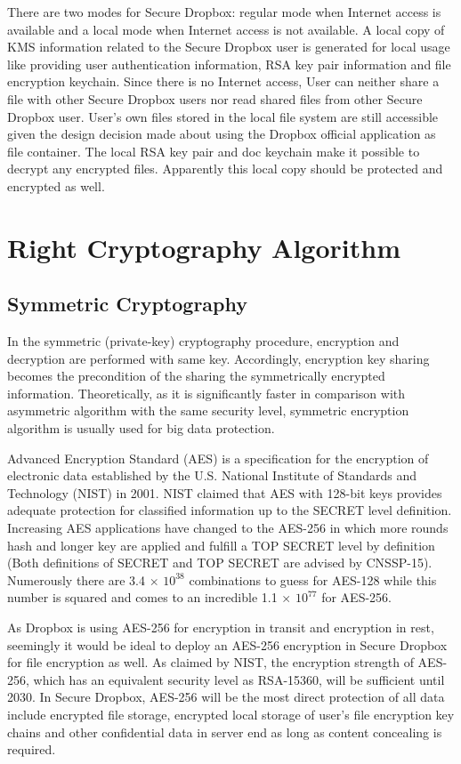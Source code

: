There are two modes for Secure Dropbox: regular mode when Internet access is available and a local mode when Internet access is not available. A local copy of KMS information related to the Secure Dropbox user is generated for local usage like providing user authentication information, RSA key pair information and file encryption keychain. Since there is no Internet access, User can neither share a file with other Secure Dropbox users nor read shared files from other Secure Dropbox user. User’s own files stored in the local file system are still accessible given the design decision made about using the Dropbox official application as file container. The local RSA key pair and doc keychain make it possible to decrypt any encrypted files. Apparently this local copy should be protected and encrypted as well.

\section{Right Cryptography Algorithm}

\subsection{Symmetric Cryptography}

In the symmetric (private-key) cryptography procedure, encryption and decryption are performed with same key\cite{Bellare1997}. Accordingly, encryption key sharing becomes the precondition of the sharing the symmetrically encrypted information. Theoretically, as it is significantly faster in comparison with asymmetric algorithm with the same security level, symmetric encryption algorithm is usually used for big data protection.

Advanced Encryption Standard (AES) is a specification for the encryption of electronic data established by the U.S. National Institute of Standards and Technology (NIST) in 2001\cite{Information2001}. NIST claimed that AES with 128-bit keys provides adequate protection for classified information up to the SECRET level definition. Increasing AES applications have changed to the AES-256 in which more rounds hash and longer key are applied and fulfill a TOP SECRET level by definition (Both definitions of SECRET and TOP SECRET are advised by CNSSP-15\cite{National2003}). Numerously there are 3.4 $\times$ $10^{38}$ combinations to guess for AES-128 while this number is squared and comes to an incredible 1.1 $\times$ $10^{77}$ for AES-256.

As Dropbox is using AES-256 for encryption in transit and encryption in rest, seemingly it would be ideal to deploy an AES-256 encryption in Secure Dropbox for file encryption as well. As claimed by NIST\cite{Publication2007}, the encryption strength of AES-256, which has an equivalent security level as RSA-15360, will be sufficient until 2030. In Secure Dropbox, AES-256 will be the most direct protection of all data include encrypted file storage, encrypted local storage of user’s file encryption key chains and other confidential data in server end as long as content concealing is required.


